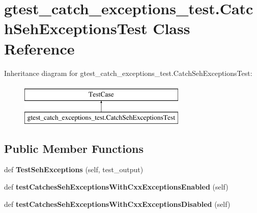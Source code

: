 \hypertarget{classgtest__catch__exceptions__test_1_1_catch_seh_exceptions_test}{}\section{gtest\+\_\+catch\+\_\+exceptions\+\_\+test.\+Catch\+Seh\+Exceptions\+Test Class Reference}
\label{classgtest__catch__exceptions__test_1_1_catch_seh_exceptions_test}
Inheritance diagram for gtest\+\_\+catch\+\_\+exceptions\+\_\+test.\+Catch\+Seh\+Exceptions\+Test\+:\begin{figure}[H]
\begin{center}
\leavevmode
\includegraphics[height=2.000000cm]{classgtest__catch__exceptions__test_1_1_catch_seh_exceptions_test}
\end{center}
\end{figure}
\subsection*{Public Member Functions}
\begin{DoxyCompactItemize}
\item 
\mbox{\label{classgtest__catch__exceptions__test_1_1_catch_seh_exceptions_test_a737bbcc64405854aa8e0aea87ca5850b}} 
def {\bfseries Test\+Seh\+Exceptions} (self, test\+\_\+output)
\item 
\mbox{\label{classgtest__catch__exceptions__test_1_1_catch_seh_exceptions_test_a02d06790fb52416a9da6a28b624e9cd9}} 
def {\bfseries test\+Catches\+Seh\+Exceptions\+With\+Cxx\+Exceptions\+Enabled} (self)
\item 
\mbox{\label{classgtest__catch__exceptions__test_1_1_catch_seh_exceptions_test_a4a181de9de2b147eff55ed7a1d7d40c4}} 
def {\bfseries test\+Catches\+Seh\+Exceptions\+With\+Cxx\+Exceptions\+Disabled} (self)
\end{DoxyCompactItemize}


